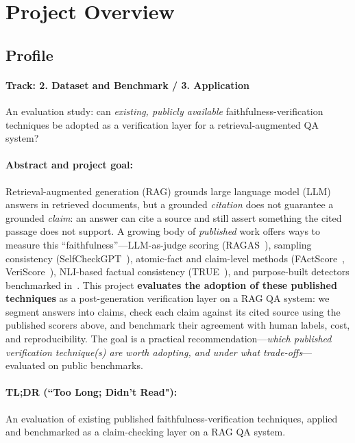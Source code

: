 \section{Project Overview}
\label{section:intro}

\subsection{Profile}

\paragraph{Track: 2. Dataset and Benchmark / 3. Application}
An evaluation study: can \emph{existing, publicly available} faithfulness-verification
techniques be adopted as a verification layer for a retrieval-augmented QA system?

\paragraph{Abstract and project goal:}
Retrieval-augmented generation (RAG) grounds large language model (LLM) answers in
retrieved documents, but a grounded \emph{citation} does not guarantee a grounded
\emph{claim}: an answer can cite a source and still assert something the cited passage
does not support. A growing body of \emph{published} work offers ways to measure this
``faithfulness''---LLM-as-judge scoring (RAGAS~\citep{es2024ragas}), sampling consistency
(SelfCheckGPT~\citep{manakul2023selfcheckgpt}), atomic-fact and claim-level methods
(FActScore~\citep{min2023factscore}, VeriScore~\citep{song2024veriscore}),
NLI-based factual consistency (TRUE~\citep{honovich2022true}), and purpose-built detectors
benchmarked in~\citet{sardana2025realtime}. This project \textbf{evaluates the adoption of
these published techniques} as a post-generation verification layer on a RAG QA system:
we segment answers into claims, check each claim against its cited source using the
published scorers above, and benchmark their agreement with human labels, cost, and
reproducibility. The goal is a practical recommendation---\emph{which published
verification technique(s) are worth adopting, and under what trade-offs}---evaluated on
public benchmarks.

\paragraph{TL;DR (``Too Long; Didn't Read"):}
An evaluation of existing published faithfulness-verification techniques, applied and
benchmarked as a claim-checking layer on a RAG QA system.


